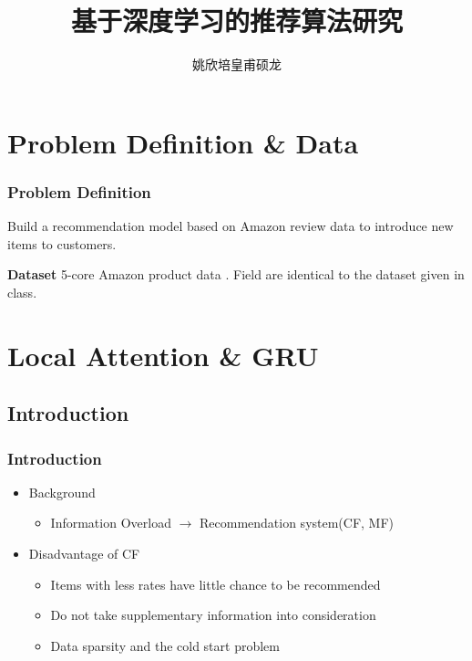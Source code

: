 \documentclass{../presentation}
\title{基于深度学习的推荐算法研究}
\author{姚欣培\;皇甫硕龙}
\begin{document}
    \begin{frame}
        \maketitle
    \end{frame}

    \small

    \section{Problem Definition \& Data}

    \begin{frame}
        \frametitle{Problem Definition}

        Build a recommendation model based on Amazon review data to introduce new items to customers.

        \textbf{Dataset} 5-core Amazon product data \cite{ni2019justifying}. Field are identical to the dataset given in class.
    \end{frame}

    \section{Local Attention \& GRU \cite{zhu2021deep}}

    \subsection{Introduction}
    \begin{frame}
        \frametitle{Introduction}

        \begin{itemize}
            \item Background
            \begin{itemize}
                \item Information Overload $\rightarrow$ Recommendation system(CF, MF)
            \end{itemize}
            \item Disadvantage of CF
            \begin{itemize}
                \item Items with less rates have little chance to be recommended
                \item Do not take supplementary information into consideration
                \item Data sparsity and the cold start problem
            \end{itemize}
        \end{itemize}

    \end{frame}
\end{document}
